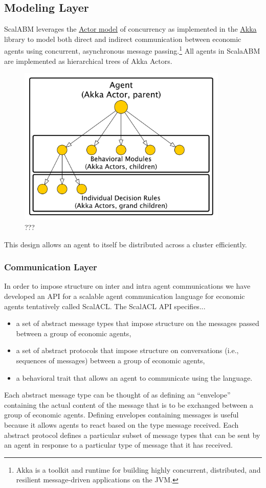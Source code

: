 \documentclass[11pt]{amsart}
\begin{document}
\subsection{Modeling Layer}
ScalABM leverages the \href{https://en.wikipedia.org/wiki/Actor_model}{Actor model} of concurrency as implemented in the \href{http://akka.io/}{Akka} library to model both direct and indirect communication between economic agents using concurrent, asynchronous message passing.\footnote{
%
Akka is a toolkit and runtime for building highly concurrent, distributed, and resilient message-driven applications on the JVM.
%
} All agents in ScalaABM are implemented as hierarchical trees of Akka Actors.
\begin{figure}[H]
\centering
\includegraphics[width=10cm]{img/hierarchical-actor-2.pdf}
\caption{???}
\end{figure}

This design allows an agent to itself be distributed across a cluster efficiently.

\subsubsection{Communication Layer}
In order to impose structure on inter and intra agent communications we have developed an API for a scalable agent communication language for economic agents tentatively called ScalACL. The ScalACL API specifies...
\begin{itemize}
    \item a set of abstract message types that impose structure on the messages passed between a group of economic agents,
    \item a set of abstract protocols that impose structure on conversations (i.e., sequences of messages) between a group of economic agents,
    \item a behavioral trait that allows an agent to communicate using the language.
\end{itemize}
Each abstract message type can be thought of as defining an ``envelope'' containing the actual content of the message that is to be exchanged between a group of economic agents. Defining envelopes containing messages is useful because it allows agents to react based on the type message received. Each abstract protocol defines a particular subset of message types that can be sent by an agent in response to a particular type of message that it has received. 
\end{document}
